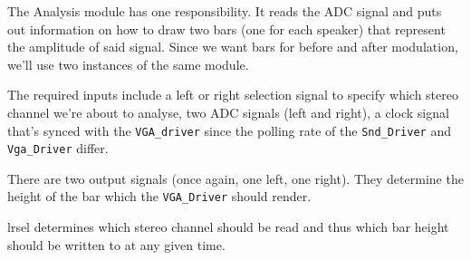 The Analysis module has one responsibility. It reads the ADC signal and puts out information on how to draw two bars (one for each speaker) that represent the amplitude of said signal. Since we want bars for before and after modulation, we'll use two instances of the same module. 

The required inputs include a left or right selection signal to specify which stereo channel we're about to analyse, two ADC signals (left and right), a clock signal that's synced with the \verb=VGA_driver= since the polling rate of the \verb=Snd_Driver= and \verb=Vga_Driver= differ.  

There are two output signals (once again, one left, one right). They determine the height of the bar which the \verb=VGA_Driver= should render. 

lrsel determines which stereo channel should be read and thus which bar height should be written to at any given time.
